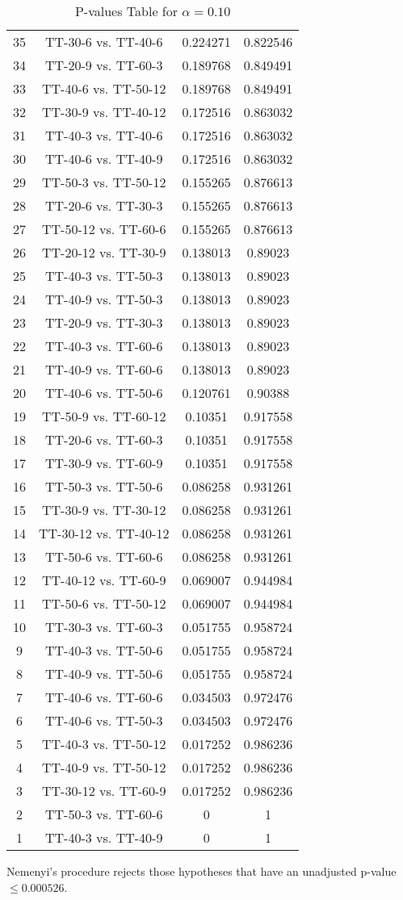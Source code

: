 \documentclass[a4paper,10pt]{article}
\begin{document}
\begin{landscape}
\begin{table}[!htp]
\begin{tabular}{cccc}
35&TT-30-6 vs. TT-40-6&0.224271&0.822546\\
34&TT-20-9 vs. TT-60-3&0.189768&0.849491\\
33&TT-40-6 vs. TT-50-12&0.189768&0.849491\\
32&TT-30-9 vs. TT-40-12&0.172516&0.863032\\
31&TT-40-3 vs. TT-40-6&0.172516&0.863032\\
30&TT-40-6 vs. TT-40-9&0.172516&0.863032\\
29&TT-50-3 vs. TT-50-12&0.155265&0.876613\\
28&TT-20-6 vs. TT-30-3&0.155265&0.876613\\
27&TT-50-12 vs. TT-60-6&0.155265&0.876613\\
26&TT-20-12 vs. TT-30-9&0.138013&0.89023\\
25&TT-40-3 vs. TT-50-3&0.138013&0.89023\\
24&TT-40-9 vs. TT-50-3&0.138013&0.89023\\
23&TT-20-9 vs. TT-30-3&0.138013&0.89023\\
22&TT-40-3 vs. TT-60-6&0.138013&0.89023\\
21&TT-40-9 vs. TT-60-6&0.138013&0.89023\\
20&TT-40-6 vs. TT-50-6&0.120761&0.90388\\
19&TT-50-9 vs. TT-60-12&0.10351&0.917558\\
18&TT-20-6 vs. TT-60-3&0.10351&0.917558\\
17&TT-30-9 vs. TT-60-9&0.10351&0.917558\\
16&TT-50-3 vs. TT-50-6&0.086258&0.931261\\
15&TT-30-9 vs. TT-30-12&0.086258&0.931261\\
14&TT-30-12 vs. TT-40-12&0.086258&0.931261\\
13&TT-50-6 vs. TT-60-6&0.086258&0.931261\\
12&TT-40-12 vs. TT-60-9&0.069007&0.944984\\
11&TT-50-6 vs. TT-50-12&0.069007&0.944984\\
10&TT-30-3 vs. TT-60-3&0.051755&0.958724\\
9&TT-40-3 vs. TT-50-6&0.051755&0.958724\\
8&TT-40-9 vs. TT-50-6&0.051755&0.958724\\
7&TT-40-6 vs. TT-60-6&0.034503&0.972476\\
6&TT-40-6 vs. TT-50-3&0.034503&0.972476\\
5&TT-40-3 vs. TT-50-12&0.017252&0.986236\\
4&TT-40-9 vs. TT-50-12&0.017252&0.986236\\
3&TT-30-12 vs. TT-60-9&0.017252&0.986236\\
2&TT-50-3 vs. TT-60-6&0&1\\
1&TT-40-3 vs. TT-40-9&0&1\\
\hline
\end{tabular}
\caption{P-values Table for $\alpha=0.10$}
\end{table}Nemenyi's procedure rejects those hypotheses that have an unadjusted p-value $\le0.000526$.


\end{landscape}
\end{document}
